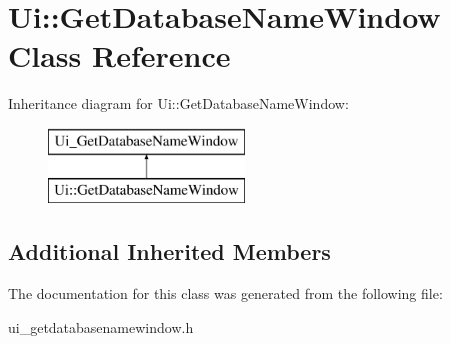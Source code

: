 \hypertarget{class_ui_1_1_get_database_name_window}{}\section{Ui\+:\+:Get\+Database\+Name\+Window Class Reference}
\label{class_ui_1_1_get_database_name_window}
Inheritance diagram for Ui\+:\+:Get\+Database\+Name\+Window\+:\begin{figure}[H]
\begin{center}
\leavevmode
\includegraphics[height=2.000000cm]{class_ui_1_1_get_database_name_window}
\end{center}
\end{figure}
\subsection*{Additional Inherited Members}


The documentation for this class was generated from the following file\+:\begin{DoxyCompactItemize}
\item 
ui\+\_\+getdatabasenamewindow.\+h\end{DoxyCompactItemize}
